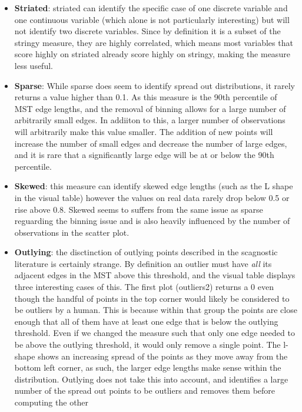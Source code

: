 \begin{itemize}
\item
  \textbf{Striated}: striated can identify the specific case of one
  discrete variable and one continuous variable (which alone is not
  particularly interesting) but will not identify two discrete
  variables. Since by definition it is a subset of the stringy measure,
  they are highly correlated, which means most variables that score
  highly on striated already score highly on stringy, making the measure
  less useful.
\item
  \textbf{Sparse}: While sparse does seem to identify spread out
  distributions, it rarely returns a value higher than 0.1. As this
  measure is the 90th percentile of MST edge lengths, and the removal of
  binning allows for a large number of arbitrarily small edges. In
  addiiton to this, a larger number of observations will arbitrarily
  make this value smaller. The addition of new points will increase the
  number of small edges and decrease the number of large edges, and it
  is rare that a significantly large edge will be at or below the 90th
  percentile.
\item
  \textbf{Skewed}: this measure can identify skewed edge lengths (such
  as the L shape in the visual table) however the values on real data
  rarely drop below 0.5 or rise above 0.8. Skewed seems to suffers from
  the same issue as sparse reguarding the binning issue and is also
  heavily influenced by the number of observations in the scatter plot.
\item
  \textbf{Outlying}: the disctinction of outlying points described in
  the scagnostic literature is certainly strange. By definition an
  outlier must have \emph{all} its adjacent edges in the MST above this
  threshold, and the visual table displays three interesting cases of
  this. The first plot (outliers2) returns a 0 even though the handful
  of points in the top corner would likely be considered to be outliers
  by a human. This is because within that group the points are close
  enough that all of them have at least one edge that is below the
  outlying threshold. Even if we changed the measure such that only one
  edge needed to be above the outlying threshold, it would only remove a
  single point. The l-shape shows an increasing spread of the points as
  they move away from the bottom left corner, as such, the larger edge
  lengths make sense within the distribution. Outlying does not take
  this into account, and identifies a large number of the spread out
  points to be outliers and removes them before computing the other

\end{itemize}
